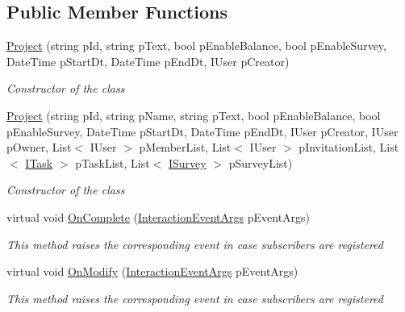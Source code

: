 \subsection*{Public Member Functions}
\begin{DoxyCompactItemize}
\item 
\hyperlink{class_plex_byte_1_1_mo_cap_1_1_interactions_1_1_project_a74a8da786a74fd3765139ef88034671c}{Project} (string p\+Id, string p\+Text, bool p\+Enable\+Balance, bool p\+Enable\+Survey, Date\+Time p\+Start\+Dt, Date\+Time p\+End\+Dt, I\+User p\+Creator)
\begin{DoxyCompactList}\small\item\em Constructor of the class \end{DoxyCompactList}\item 
\hyperlink{class_plex_byte_1_1_mo_cap_1_1_interactions_1_1_project_aee7a878c58675b85315590eebc17f654}{Project} (string p\+Id, string p\+Name, string p\+Text, bool p\+Enable\+Balance, bool p\+Enable\+Survey, Date\+Time p\+Start\+Dt, Date\+Time p\+End\+Dt, I\+User p\+Creator, I\+User p\+Owner, List$<$ I\+User $>$ p\+Member\+List, List$<$ I\+User $>$ p\+Invitation\+List, List$<$ \hyperlink{interface_plex_byte_1_1_mo_cap_1_1_interactions_1_1_i_task}{I\+Task} $>$ p\+Task\+List, List$<$ \hyperlink{interface_plex_byte_1_1_mo_cap_1_1_interactions_1_1_i_survey}{I\+Survey} $>$ p\+Survey\+List)
\begin{DoxyCompactList}\small\item\em Constructor of the class \end{DoxyCompactList}\item 
virtual void \hyperlink{class_plex_byte_1_1_mo_cap_1_1_interactions_1_1_project_a039fdf13ac3d4b2b83cb0f3ce7fb4ca1}{On\+Complete} (\hyperlink{class_plex_byte_1_1_mo_cap_1_1_interactions_1_1_interaction_event_args}{Interaction\+Event\+Args} p\+Event\+Args)
\begin{DoxyCompactList}\small\item\em This method raises the corresponding event in case subscribers are registered \end{DoxyCompactList}\item 
virtual void \hyperlink{class_plex_byte_1_1_mo_cap_1_1_interactions_1_1_project_a3255cca2b9dbe1fc60a39463d33a9c31}{On\+Modify} (\hyperlink{class_plex_byte_1_1_mo_cap_1_1_interactions_1_1_interaction_event_args}{Interaction\+Event\+Args} p\+Event\+Args)
\begin{DoxyCompactList}\small\item\em This method raises the corresponding event in case subscribers are registered \end{DoxyCompactList}\item 

\end{DoxyCompactItemize}
